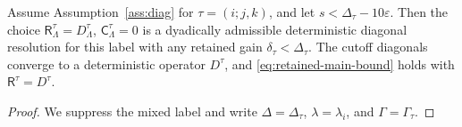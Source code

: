 \documentclass[10pt,a4paper]{amsart}
\newcommand{\Ctr}{\mathsf C}
\newcommand{\Ret}{\mathsf R}
\newcommand{\eps}{\varepsilon}
\begin{document}
\begin{proposition}\label{prop:diagonal}
Assume Assumption~\ref{ass:diag} for \(\tau=(i;j,k)\), and let \(s<\Delta_\tau-10\eps\).  Then the choice \(\Ret^\tau_\Lambda=D^\tau_\Lambda\), \(\Ctr^\tau_\Lambda=0\) is a dyadically admissible deterministic diagonal resolution for this label with any retained gain \(\delta_\tau<\Delta_\tau\).  The cutoff diagonals converge to a deterministic operator \(D^\tau\), and \eqref{eq:retained-main-bound} holds with \(\Ret^\tau=D^\tau\).
\end{proposition}

\begin{proof}
We suppress the mixed label and write \(\Delta=\Delta_\tau\), \(\lambda=\lambda_i\), and \(\Gamma=\Gamma_\tau\).


\end{proof}
\end{document}

